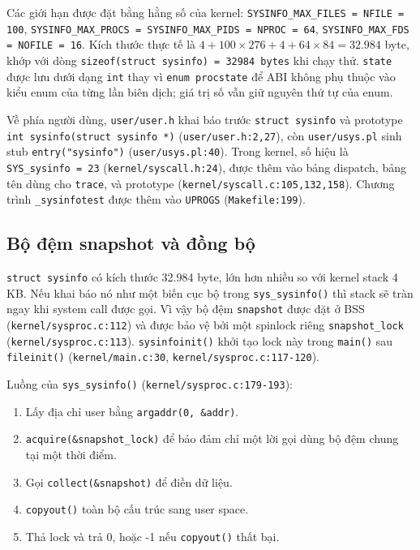 Các giới hạn được đặt bằng hằng số của kernel: \texttt{SYSINFO\_MAX\_FILES = NFILE = 100}, \texttt{SYSINFO\_MAX\_PROCS = SYSINFO\_MAX\_PIDS = NPROC = 64}, \texttt{SYSINFO\_MAX\_FDS = NOFILE = 16}. Kích thước thực tế là $4 + 100 \times 276 + 4 + 64 \times 84 = 32.984$ byte, khớp với dòng \texttt{sizeof(struct sysinfo) = 32984 bytes} khi chạy thử. \texttt{state} được lưu dưới dạng \texttt{int} thay vì \texttt{enum procstate} để ABI không phụ thuộc vào kiểu enum của từng lần biên dịch; giá trị số vẫn giữ nguyên thứ tự của enum.

Về phía người dùng, \texttt{user/user.h} khai báo trước \texttt{struct sysinfo} và prototype \texttt{int sysinfo(struct sysinfo *)} (\texttt{user/user.h:2,27}), còn \texttt{user/usys.pl} sinh stub \texttt{entry("sysinfo")} (\texttt{user/usys.pl:40}). Trong kernel, số hiệu là \texttt{SYS\_sysinfo = 23} (\texttt{kernel/syscall.h:24}), được thêm vào bảng dispatch, bảng tên dùng cho \texttt{trace}, và prototype (\texttt{kernel/syscall.c:105,132,158}). Chương trình \texttt{\_sysinfotest} được thêm vào \texttt{UPROGS} (\texttt{Makefile:199}).

\subsection{Bộ đệm snapshot và đồng bộ}

\texttt{struct sysinfo} có kích thước 32.984 byte, lớn hơn nhiều so với kernel stack 4 KB. Nếu khai báo nó như một biến cục bộ trong \texttt{sys\_sysinfo()} thì stack sẽ tràn ngay khi system call được gọi. Vì vậy bộ đệm \texttt{snapshot} được đặt ở BSS (\texttt{kernel/sysproc.c:112}) và được bảo vệ bởi một spinlock riêng \texttt{snapshot\_lock} (\texttt{kernel/sysproc.c:113}). \texttt{sysinfoinit()} khởi tạo lock này trong \texttt{main()} sau \texttt{fileinit()} (\texttt{kernel/main.c:30}, \texttt{kernel/sysproc.c:117-120}).

Luồng của \texttt{sys\_sysinfo()} (\texttt{kernel/sysproc.c:179-193}):

\begin{enumerate}[itemsep=0pt, topsep=2.5pt, leftmargin=1.5cm]
    \item Lấy địa chỉ user bằng \texttt{argaddr(0, \&addr)}.
    \item \texttt{acquire(\&snapshot\_lock)} để bảo đảm chỉ một lời gọi dùng bộ đệm chung tại một thời điểm.
    \item Gọi \texttt{collect(\&snapshot)} để điền dữ liệu.
    \item \texttt{copyout()} toàn bộ cấu trúc sang user space.
    \item Thả lock và trả 0, hoặc -1 nếu \texttt{copyout()} thất bại.
\end{enumerate}

